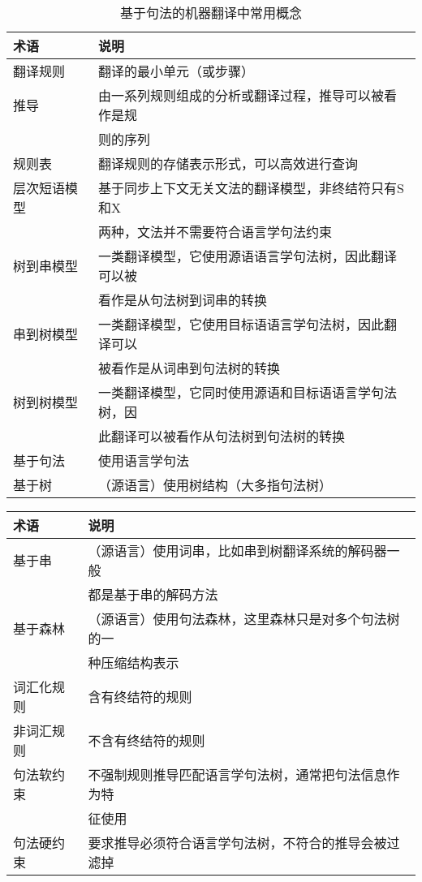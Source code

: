 \begin{table}[htp]{
\begin{center}
\caption{基于句法的机器翻译中常用概念}
\label{tab:8-2}
{
\begin{tabular}{p{6.5em} | l}
术语 & 说明 \\
\hline
\rule{0pt}{15pt}翻译规则 & 翻译的最小单元（或步骤） \\
\rule{0pt}{15pt}推导 & 由一系列规则组成的分析或翻译过程，推导可以被看作是规\\
&则的序列 \\
\rule{0pt}{15pt}规则表 & 翻译规则的存储表示形式，可以高效进行查询 \\
\rule{0pt}{15pt}层次短语模型 & 基于同步上下文无关文法的翻译模型，非终结符只有S和X\\
&两种，文法并不需要符合语言学句法约束 \\
\rule{0pt}{15pt}树到串模型 & 一类翻译模型，它使用源语语言学句法树，因此翻译可以被\\
&看作是从句法树到词串的转换 \\
\rule{0pt}{15pt}串到树模型 & 一类翻译模型，它使用目标语语言学句法树，因此翻译可以\\
&被看作是从词串到句法树的转换 \\
\rule{0pt}{15pt}树到树模型 & 一类翻译模型，它同时使用源语和目标语语言学句法树，因\\
&此翻译可以被看作从句法树到句法树的转换 \\
\rule{0pt}{15pt}基于句法 & 使用语言学句法 \\
\rule{0pt}{15pt}基于树 &（源语言）使用树结构（大多指句法树） \\
\end{tabular}
}
\end{center}
}\end{table}
\begin{table}[htp]{
\begin{center}
{
\begin{tabular}{p{6.5em} | l}
术语 & 说明 \\
\hline
\rule{0pt}{15pt}基于串 &（源语言）使用词串，比如串到树翻译系统的解码器一般\\
&都是基于串的解码方法 \\
\rule{0pt}{15pt}基于森林 &（源语言）使用句法森林，这里森林只是对多个句法树的一 \\
                         & 种压缩结构表示 \\
\rule{0pt}{15pt}词汇化规则 & 含有终结符的规则 \\
\rule{0pt}{15pt}非词汇规则 & 不含有终结符的规则 \\
\rule{0pt}{15pt}句法软约束 & 不强制规则推导匹配语言学句法树，通常把句法信息作为特\\
&征使用 \\
\rule{0pt}{15pt}句法硬约束 & 要求推导必须符合语言学句法树，不符合的推导会被过滤掉 \\
\end{tabular}
}
\end{center}
}\end{table}

